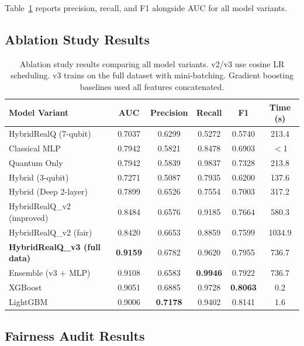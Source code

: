 \documentclass[12pt, letterpaper]{article}
\begin{document}
Table~\ref{tab:ablation} reports precision, recall, and F1 alongside AUC for all model variants.

\subsection{Ablation Study Results}

\begin{table}[h!]
\centering
\caption{Ablation study results comparing all model variants. v2/v3 use cosine LR scheduling. v3 trains on the full dataset with mini-batching. Gradient boosting baselines used all features concatenated.}
\label{tab:ablation}
\begin{tabular}{@{}lccccc@{}}
\toprule
\textbf{Model Variant} & \textbf{AUC} & \textbf{Precision} & \textbf{Recall} & \textbf{F1} & \textbf{Time (s)} \\
\midrule
HybridRealQ (7-qubit)       & 0.7037 & 0.6299 & 0.5272 & 0.5740 & 213.4 \\
Classical MLP                & 0.7942 & 0.5821 & 0.8478 & 0.6903 & $<$1 \\
Quantum Only                 & 0.7942 & 0.5839 & 0.9837 & 0.7328 & 213.8 \\
Hybrid (3-qubit)             & 0.7271 & 0.5087 & 0.7935 & 0.6200 & 137.6 \\
Hybrid (Deep 2-layer)        & 0.7899 & 0.6526 & 0.7554 & 0.7003 & 317.2 \\
\midrule
HybridRealQ\_v2 (improved)   & 0.8484 & 0.6576 & 0.9185 & 0.7664 & 580.3 \\
HybridRealQ\_v2 (fair)       & 0.8420 & 0.6653 & 0.8859 & 0.7599 & 1034.9 \\
\midrule
\textbf{HybridRealQ\_v3 (full data)} & \textbf{0.9159} & 0.6782 & 0.9620 & 0.7955 & 736.7 \\
Ensemble (v3 + MLP)          & 0.9108 & 0.6583 & \textbf{0.9946} & 0.7922 & 736.7 \\
\midrule
XGBoost                      & 0.9051 & 0.6885 & 0.9728 & \textbf{0.8063} & 0.2 \\
LightGBM                     & 0.9006 & \textbf{0.7178} & 0.9402 & 0.8141 & 1.6 \\
\bottomrule
\end{tabular}
\end{table}

\subsection{Fairness Audit Results}
\end{document}
